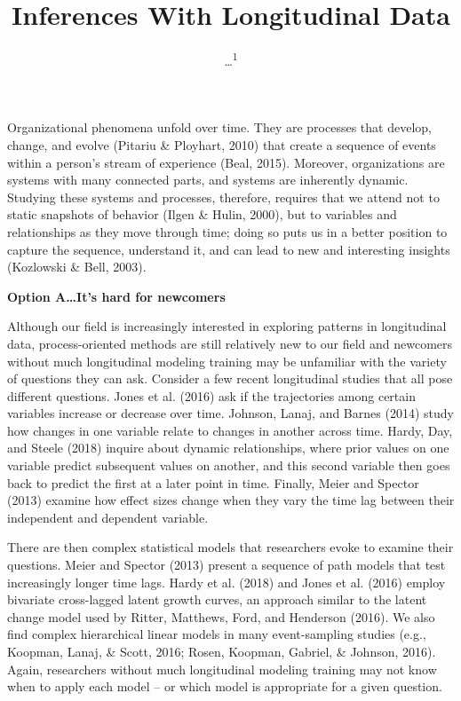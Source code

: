 \documentclass[english,,man]{apa6}
\title{Inferences With Longitudinal Data}
\author{\ldots{}\textsuperscript{1}}
\date{}
\affiliation{
\vspace{0.5cm}
\textsuperscript{1} ...}
\theoremstyle{definition}
\theoremstyle{definition}
\theoremstyle{definition}
\theoremstyle{remark}
\begin{document}
\maketitle

Organizational phenomena unfold over time. They are processes that
develop, change, and evolve (Pitariu \& Ployhart, 2010) that create a
sequence of events within a person's stream of experience (Beal, 2015).
Moreover, organizations are systems with many connected parts, and
systems are inherently dynamic. Studying these systems and processes,
therefore, requires that we attend not to static snapshots of behavior
(Ilgen \& Hulin, 2000), but to variables and relationships as they move
through time; doing so puts us in a better position to capture the
sequence, understand it, and can lead to new and interesting insights
(Kozlowski \& Bell, 2003).

\textbf{Option A\ldots{}It's hard for newcomers}

Although our field is increasingly interested in exploring patterns in
longitudinal data, process-oriented methods are still relatively new to
our field and newcomers without much longitudinal modeling training may
be unfamiliar with the variety of questions they can ask. Consider a few
recent longitudinal studies that all pose different questions. Jones et
al. (2016) ask if the trajectories among certain variables increase or
decrease over time. Johnson, Lanaj, and Barnes (2014) study how changes
in one variable relate to changes in another across time. Hardy, Day,
and Steele (2018) inquire about dynamic relationships, where prior
values on one variable predict subsequent values on another, and this
second variable then goes back to predict the first at a later point in
time. Finally, Meier and Spector (2013) examine how effect sizes change
when they vary the time lag between their independent and dependent
variable.

There are then complex statistical models that researchers evoke to
examine their questions. Meier and Spector (2013) present a sequence of
path models that test increasingly longer time lags. Hardy et al. (2018)
and Jones et al. (2016) employ bivariate cross-lagged latent growth
curves, an approach similar to the latent change model used by Ritter,
Matthews, Ford, and Henderson (2016). We also find complex hierarchical
linear models in many event-sampling studies (e.g., Koopman, Lanaj, \&
Scott, 2016; Rosen, Koopman, Gabriel, \& Johnson, 2016). Again,
researchers without much longitudinal modeling training may not know
when to apply each model -- or which model is appropriate for a given
question.
\end{document}
